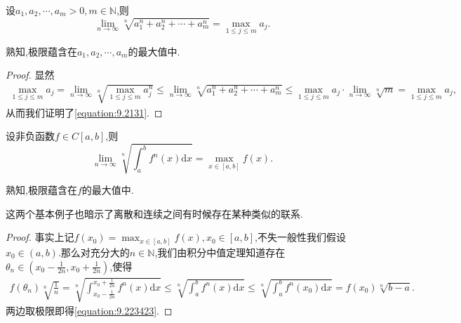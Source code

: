 \documentclass[../../main.tex]{subfiles}%
\begin{document}
\begin{example}
设\(a_1,a_2,\cdots,a_m > 0,m \in \mathbb{N}\),则
\[
\lim_{n \to \infty} \sqrt[n]{a_1^n + a_2^n + \cdots + a_m^n} = \max_{1\leqslant  j\leqslant  m} a_j.
\]
\end{example} 
\begin{remark}
熟知,极限蕴含在\(a_1,a_2,\cdots,a_m\)的最大值中.
\end{remark}
\begin{proof}
显然
\begin{align}\label{equation:9.2131}
\max_{1\leqslant  j\leqslant  m} a_j = \lim_{n \to \infty} \sqrt[n]{\max_{1\leqslant  j\leqslant  m} a_j^n} \leqslant  \lim_{n \to \infty} \sqrt[n]{a_1^n + a_2^n + \cdots + a_m^n} \leqslant  \max_{1\leqslant  j\leqslant  m} a_j \cdot \lim_{n \to \infty} \sqrt[n]{m} = \max_{1\leqslant  j\leqslant  m} a_j,
\end{align}
从而我们证明了\eqref{equation:9.2131}.  
\end{proof}

\begin{example}\label{example-3.31}
设非负函数\(f \in C[a,b]\),则
\[
\lim_{n \to \infty} \sqrt[n]{\int_{a}^{b} f^n(x)\mathrm{d}x} = \max_{x\in[a,b]} f(x).
\]
\end{example}
\begin{remark}
熟知,极限蕴含在\(f\)的最大值中. 
\end{remark}
\begin{note}
这两个基本例子也暗示了离散和连续之间有时候存在某种类似的联系.
\end{note}
\begin{proof}
事实上记\(f(x_0) = \max_{x\in[a,b]} f(x), x_0 \in [a,b]\),不失一般性我们假设\(x_0 \in (a,b)\).那么对充分大的\(n \in \mathbb{N}\),我们由积分中值定理知道存在\(\theta_n \in (x_0 - \frac{1}{2n}, x_0 + \frac{1}{2n})\),使得
\begin{align}\label{equation:9.223423}
f(\theta_n) \sqrt[n]{\frac{1}{n}} = \sqrt[n]{\int_{x_0 - \frac{1}{2n}}^{x_0 + \frac{1}{2n}} f^n(x)\mathrm{d}x} \leqslant  \sqrt[n]{\int_{a}^{b} f^n(x)\mathrm{d}x} \leqslant  \sqrt[n]{\int_{a}^{b} f^n(x_0)\mathrm{d}x} = f(x_0) \sqrt[n]{b - a}.   
\end{align}
两边取极限即得\eqref{equation:9.223423}.
\end{proof}
\end{document}
